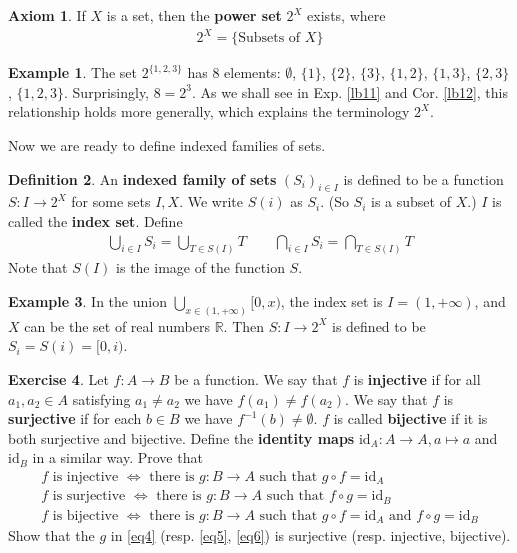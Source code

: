 \documentclass[12pt,b5paper,notitlepage]{article}
\theoremstyle{definition}
\newtheorem{df}{Definition}[section]
\newtheorem{eg}[df]{Example}
\newtheorem{exe}[df]{Exercise}
\newtheorem*{axiom}{Axiom}
\theoremstyle{plain}
\newcommand{\id}{\mathrm{id}}
\newcommand{\Rbb}{\mathbb R}
\numberwithin{equation}{section}
\begin{document}
\begin{axiom}
If $X$ is a set, then the \textbf{power set}  $2^X$ exists, where
\begin{align*}
2^X=\{\text{Subsets of }X\}
\end{align*}
\end{axiom}

\begin{eg}
The set $2^{\{1,2,3\}}$ has $8$ elements: $\emptyset$, $\{1\}$, $\{2\}$, $\{3\}$, $\{1,2\}$, $\{1,3\}$, $\{2,3\}$, $\{1,2,3\}$. Surprisingly, $8=2^3$. As we shall see in Exp. \ref{lb11} and Cor. \ref{lb12}, this relationship holds more generally, which explains the terminology $2^X$.  
\end{eg}

Now we are ready to define indexed families of sets.
\begin{df}\label{lb1}
An \textbf{indexed family of sets}   $(S_i)_{i\in I}$ is defined to be a function $S:I\rightarrow 2^X$ for some sets $I,X$. We write $S(i)$ as $S_i$. (So $S_i$ is a subset of $X$.) $I$ is called the \textbf{index set}. Define
\begin{align*}
\bigcup_{i\in I}S_i= \bigcup_{T\in S(I)}T\qquad \bigcap_{i\in I}S_i= \bigcap_{T\in S(I)}T
\end{align*}
Note that $S(I)$ is the image of the function $S$.
\end{df}


\begin{eg}
In the union $\bigcup_{x\in(1,+\infty)}[0,x)$, the index set is $I=(1,+\infty)$, and $X$ can be the set of real numbers $\Rbb$. Then $S:I\rightarrow 2^X$ is defined to be $S_i=S(i)=[0,i)$.
\end{eg}




\begin{exe}\label{lb5}
Let $f:A\rightarrow B$ be a function. We say that $f$ is \textbf{injective} if for all $a_1,a_2\in A$ satisfying $a_1\neq a_2$ we have $f(a_1)\neq f(a_2)$. We say that $f$ is \textbf{surjective} if for each $b\in B$ we have $f^{-1}(b)\neq\emptyset$. $f$ is called \textbf{bijective} if it is both surjective and bijective. Define the \textbf{identity maps} $\id_A:A\rightarrow A,a\mapsto a$ \index{id@$\id_A$} and $\id_B$ in a similar way. Prove that
\begin{subequations}
\begin{gather}
\text{$f$ is injective $\Longleftrightarrow$ there is $g:B\rightarrow A$ such that $g\circ f=\id_A$}\label{eq4}\\
\text{$f$ is surjective $\Longleftrightarrow$ there is $g:B\rightarrow A$ such that $f\circ g=\id_B$}\label{eq5}\\
\text{$f$ is bijective $\Longleftrightarrow$ there is $g:B\rightarrow A$ such that $g\circ f=\id_A$ and $f\circ g=\id_B$}\label{eq6}
\end{gather}
\end{subequations}
Show that the $g$ in \eqref{eq4} (resp. \eqref{eq5}, \eqref{eq6}) is surjective (resp. injective, bijective).
\end{exe}
\end{document}
